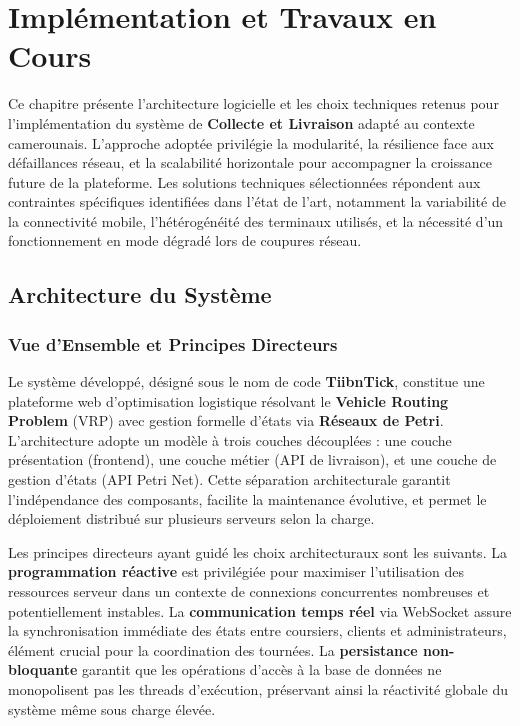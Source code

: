 \chapter{Implémentation et Travaux en Cours}

Ce chapitre présente l'architecture logicielle et les choix techniques retenus pour l'implémentation du système de \textbf{Collecte et Livraison} adapté au contexte camerounais. L'approche adoptée privilégie la modularité, la résilience face aux défaillances réseau, et la scalabilité horizontale pour accompagner la croissance future de la plateforme. Les solutions techniques sélectionnées répondent aux contraintes spécifiques identifiées dans l'état de l'art, notamment la variabilité de la connectivité mobile, l'hétérogénéité des terminaux utilisés, et la nécessité d'un fonctionnement en mode dégradé lors de coupures réseau.

\section{Architecture du Système}

\subsection{Vue d'Ensemble et Principes Directeurs}

Le système développé, désigné sous le nom de code \textbf{TiibnTick}, constitue une plateforme web d'optimisation logistique résolvant le \textbf{Vehicle Routing Problem} (VRP) avec gestion formelle d'états via \textbf{Réseaux de Petri}. L'architecture adopte un modèle à trois couches découplées : une couche présentation (frontend), une couche métier (API de livraison), et une couche de gestion d'états (API Petri Net). Cette séparation architecturale garantit l'indépendance des composants, facilite la maintenance évolutive, et permet le déploiement distribué sur plusieurs serveurs selon la charge.

Les principes directeurs ayant guidé les choix architecturaux sont les suivants. La \textbf{programmation réactive} est privilégiée pour maximiser l'utilisation des ressources serveur dans un contexte de connexions concurrentes nombreuses et potentiellement instables. La \textbf{communication temps réel} via WebSocket assure la synchronisation immédiate des états entre coursiers, clients et administrateurs, élément crucial pour la coordination des tournées. La \textbf{persistance non-bloquante} garantit que les opérations d'accès à la base de données ne monopolisent pas les threads d'exécution, préservant ainsi la réactivité globale du système même sous charge élevée.

